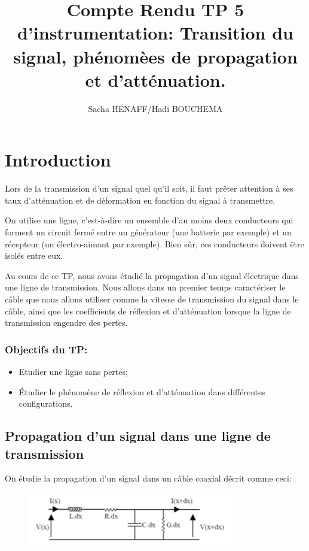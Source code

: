 \documentclass[12pt,a4paper, french]{article}
\title{Compte Rendu TP 5 d'instrumentation: Transition du signal, phénomèes de propagation et d'atténuation.}
\author{Sacha HENAFF/Hadi BOUCHEMA}
\date{}
\begin{document}
    \maketitle
    \tableofcontents
    \section*{Introduction}
    Lors de la transmission d'un signal quel qu'il soit, il faut prêter attention à ses taux d'atténuation
     et de déformation en fonction du signal à transmettre. 
    
     On utilise une ligne, c'est-à-dire un ensemble d'au moins deux conducteurs qui forment un circuit
     fermé entre un générateur (une batterie par exemple) et un récepteur (un électro-aimant par exemple). Bien sûr, 
     ces conducteurs doivent être isolés entre eux.
    
    Au cours de ce TP, nous avons étudié la propagation d'un signal électrique dans une ligne de 
    transmission. Nous allons dans un premier temps caractériser le câble que nous allons utiliser comme la vitesse 
    de transmission du signal dans le câble, ainsi que les coefficients de réflexion et d'atténuation lorsque la ligne 
    de transmission engendre des pertes. 
    
    \subsubsection*{Objectifs du TP:}
    \begin{itemize}
        \item Etudier une ligne sans pertes;
        \item Étudier le phénomène de réflexion et d'atténuation dans différentes configurations.
        \end{itemize}
    
    
    \begin{center}
    \section{Propagation d'un signal dans une ligne de transmission}
    \end{center}
    
    On étudie la propagation d’un signal dans un câble coaxial décrit comme ceci:
    \begin{figure}[!h]
    \begin{center}
        \includegraphics[width=9cm,height=2.5cm]{cablecoax.png}
    \end{center}
    \end{figure}
    
\end{document}

